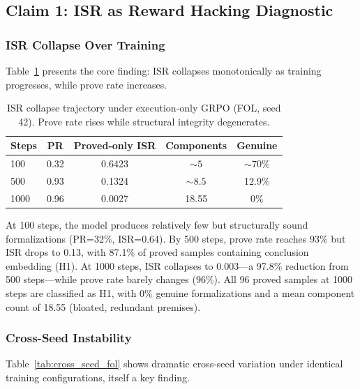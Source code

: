 \documentclass[11pt,a4paper]{article}
\newcommand{\isr}{\textsc{ISR}}
\newcommand{\pr}{\textsc{PR}}
\begin{document}
\subsection{Claim 1: \isr{} as Reward Hacking Diagnostic}
\label{sec:claim1}

\subsubsection{ISR Collapse Over Training}

Table~\ref{tab:isr_collapse} presents the core finding: \isr{} collapses monotonically as training progresses, while prove rate increases.

\begin{table}[h]
\centering
\caption{ISR collapse trajectory under execution-only GRPO (FOL, seed 42). Prove rate rises while structural integrity degenerates.}
\label{tab:isr_collapse}
\begin{tabular}{lcccc}
\toprule
Steps & PR & Proved-only ISR & Components & Genuine \\
\midrule
100 & 0.32 & 0.6423 & ${\sim}5$ & ${\sim}70\%$ \\
500 & 0.93 & 0.1324 & ${\sim}8.5$ & 12.9\% \\
1000 & 0.96 & 0.0027 & 18.55 & 0\% \\
\bottomrule
\end{tabular}
\end{table}

At 100 steps, the model produces relatively few but structurally sound formalizations (\pr{}=32\%, \isr{}=0.64).
By 500 steps, prove rate reaches 93\% but \isr{} drops to 0.13, with 87.1\% of proved samples containing conclusion embedding (H1).
At 1000 steps, \isr{} collapses to 0.003---a 97.8\% reduction from 500 steps---while prove rate barely changes (96\%).
All 96 proved samples at 1000 steps are classified as H1, with 0\% genuine formalizations and a mean component count of 18.55 (bloated, redundant premises).

\subsubsection{Cross-Seed Instability}
\label{sec:cross_seed}

Table~\ref{tab:cross_seed_fol} shows dramatic cross-seed variation under identical training configurations, itself a key finding.
\end{document}

